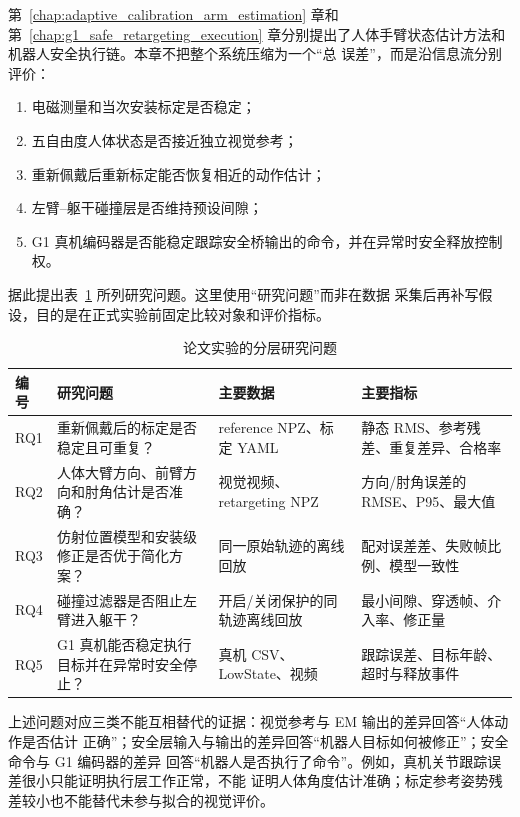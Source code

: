 第~\ref{chap:adaptive_calibration_arm_estimation} 章和第~\ref{chap:g1_safe_retargeting_execution}
章分别提出了人体手臂状态估计方法和机器人安全执行链。本章不把整个系统压缩为一个“总
误差”，而是沿信息流分别评价：
\begin{enumerate}[label=\arabic*)]
  \item 电磁测量和当次安装标定是否稳定；
  \item 五自由度人体状态是否接近独立视觉参考；
  \item 重新佩戴后重新标定能否恢复相近的动作估计；
  \item 左臂--躯干碰撞层是否维持预设间隙；
  \item G1 真机编码器是否能稳定跟踪安全桥输出的命令，并在异常时安全释放控制权。
\end{enumerate}

据此提出表~\ref{tab:ch6_research_questions} 所列研究问题。这里使用“研究问题”而非在数据
采集后再补写假设，目的是在正式实验前固定比较对象和评价指标。

\begin{table}[htbp]
  \centering
  \caption{论文实验的分层研究问题}
  \label{tab:ch6_research_questions}
  \begin{tabularx}{\linewidth}{@{}lXXX@{}}
    \toprule
    编号 & 研究问题 & 主要数据 & 主要指标 \\
    \midrule
    RQ1 & 重新佩戴后的标定是否稳定且可重复？
        & reference NPZ、标定 YAML & 静态 RMS、参考残差、重复差异、合格率 \\
    RQ2 & 人体大臂方向、前臂方向和肘角估计是否准确？
        & 视觉视频、retargeting NPZ & 方向/肘角误差的 RMSE、P95、最大值 \\
    RQ3 & 仿射位置模型和安装级修正是否优于简化方案？
        & 同一原始轨迹的离线回放 & 配对误差差、失败帧比例、模型一致性 \\
    RQ4 & 碰撞过滤器是否阻止左臂进入躯干？
        & 开启/关闭保护的同轨迹离线回放 & 最小间隙、穿透帧、介入率、修正量 \\
    RQ5 & G1 真机能否稳定执行目标并在异常时安全停止？
        & 真机 CSV、LowState、视频 & 跟踪误差、目标年龄、超时与释放事件 \\
    \bottomrule
  \end{tabularx}
\end{table}

上述问题对应三类不能互相替代的证据：视觉参考与 EM 输出的差异回答“人体动作是否估计
正确”；安全层输入与输出的差异回答“机器人目标如何被修正”；安全命令与 G1 编码器的差异
回答“机器人是否执行了命令”。例如，真机关节跟踪误差很小只能证明执行层工作正常，不能
证明人体角度估计准确；标定参考姿势残差较小也不能替代未参与拟合的视觉评价。

